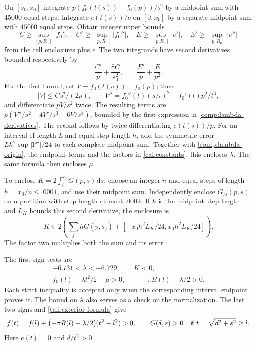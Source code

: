 On $[s_0,x_0]$ integrate
$p(f_0(t(s))-f_0(p))/s^2$ by a midpoint sum with $45000$ equal
steps.  Integrate $e(t(s))/p$ on $[0,x_0]$ by a separate midpoint
sum with $45000$ equal steps.  Obtain integer upper bounds
\[
 C\ge\sup_{[p,R_0]}|f_0'|,\quad
 C'\ge\sup_{[p,R_0]}|f_0''|,\quad
 E\ge\sup_{[p,R_0]}|e'|,\quad
 E'\ge\sup_{[p,R_0]}|e''|
\]
from the cell enclosures plus $\epsilon$.  The two integrands have
second derivatives bounded respectively by
\begin{equation}\label{comp:lambda-derivatives}
 \frac{C'}p+\frac{8C}{s_0^2},\qquad
 \frac{E'}p+\frac E{p^2}.
\end{equation}
For the first bound, set $V=f_0(t(s))-f_0(p)$; then
\[
 |V|\le Cs^2/(2p),\qquad
 V''=f_0''(t)(s/t)^2+f_0'(t)p^2/t^3,
\]
and differentiate $pV/s^2$ twice.  The resulting terms are
$p(V''/s^2-4V'/s^3+6V/s^4)$, bounded by the first expression in
\eqref{comp:lambda-derivatives}.  The second follows by twice
differentiating $e(t(s))/p$.
For an interval of length $L$ and equal step length $h$, add the
symmetric error $Lh^2\sup|Y''|/24$ to each complete midpoint sum.
Together with \eqref{comp:lambda-origin}, the endpoint terms and
the factors in \eqref{cal:constants}, this encloses $\lambda$.
The same formula then encloses $\mu$.

To enclose $K=2\int_0^{x_0}G(p,s)\,\mathrm ds$, choose an integer
$n$ and equal steps of length $h=x_0/n\le.0001$, and use their
midpoint sum.  Independently enclose
$G_{ss}(p,s)$ on a partition with step length at most $.0002$.
If $h$ is the midpoint step length and $L_K$ bounds this second
derivative, the enclosure is
\begin{equation}\label{comp:K-quadrature}
 K\in2\left(\sum_jhG(p,s_j)
                   +[-x_0h^2L_K/24,x_0h^2L_K/24]\right).
\end{equation}
The factor two multiplies both the sum and its error.

The first sign tests are
\begin{equation}\label{comp:tail-signs}
 \begin{gathered}
 -6.731<\lambda<-6.729,\qquad K<0,\\
 f_0(l)-\lambda l^2/2-\mu>0,\qquad
                  -\pi B(l)-\lambda/2>0.
 \end{gathered}
\end{equation}
Each strict inequality is accepted only when the corresponding
interval endpoint proves it.  The bound on $\lambda$ also serves
as a check on the normalization.  The last two signs and
\eqref{tail:exterior-formula} give
\begin{equation}\label{comp:positive-tail}
 f(t)=f(l)+\bigl(-\pi B(l)-\lambda/2\bigr)(t^2-l^2)>0,
 \qquad G(d,s)>0\quad\hbox{if }t=\sqrt{d^2+s^2}\ge l.
\end{equation}
Here $e(t)=0$ and $d/t^2>0$.

